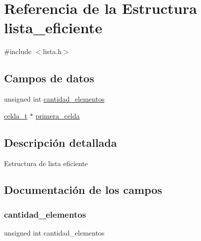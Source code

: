 \hypertarget{structlista__eficiente}{}\section{Referencia de la Estructura lista\+\_\+eficiente}
\label{structlista__eficiente}


{\ttfamily \#include $<$lista.\+h$>$}

\subsection*{Campos de datos}
\begin{DoxyCompactItemize}
\item 
unsigned int \hyperlink{structlista__eficiente_aa53366df68271654d61b63ac31790fea}{cantidad\+\_\+elementos}
\item 
\hyperlink{lista_8h_a0a1091d8fab370e7a9537f180ea892db}{celda\+\_\+t} $\ast$ \hyperlink{structlista__eficiente_a816efac5692ee6b781f0055fe063df39}{primera\+\_\+celda}
\end{DoxyCompactItemize}


\subsection{Descripción detallada}
Estructura de lista eficiente 

\subsection{Documentación de los campos}
\hypertarget{structlista__eficiente_aa53366df68271654d61b63ac31790fea}{}\label{structlista__eficiente_aa53366df68271654d61b63ac31790fea} 
\subsubsection{\texorpdfstring{cantidad\+\_\+elementos}{cantidad\_elementos}}
{\footnotesize\ttfamily unsigned int cantidad\+\_\+elementos}

\hypertarget{structlista__eficiente_a816efac5692ee6b781f0055fe063df39}{}\label{structlista__eficiente_a816efac5692ee6b781f0055fe063df39} 
